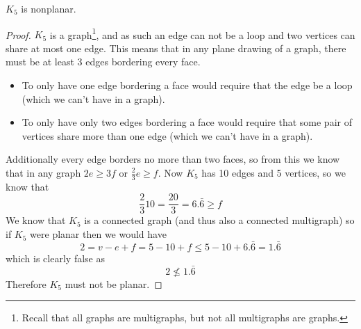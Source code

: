 \documentclass{article}
\begin{document}
\begin{theorem}
	$K_5$ is nonplanar.
\end{theorem}
\begin{center}

	\scalebox{.9}{$K_5$}
\end{center}
\begin{proof}
	$K_5$ is a graph\footnote{Recall that all graphs are multigraphs, but not all multigraphs are graphs.}, and as such an edge can not be a loop and two vertices can share at most one edge. This means that in any plane drawing of a graph, there must be at least 3 edges bordering every face.
	\begin{itemize}
		\item To only have one edge bordering a face would require that the edge be a loop (which we can't have in a graph).
		\item To only have only two edges bordering a face would require that some pair of vertices share more than one edge (which we can't have in a graph).
	\end{itemize}
	Additionally every edge borders no more than two faces, so from this we know that in any graph $2e \ge 3f$ or $\frac23e\ge f$. Now $K_5$ has 10 edges and 5 vertices, so we know that $$\frac2310=\frac{20}3=6.\bar6\ge f$$ We know that $K_5$ is a connected graph (and thus also a connected multigraph) so if $K_5$ were planar then we would have $$2=v-e+f=5-10+f\le5-10+6.\bar6 = 1.\bar6$$ which is clearly false as $$2\not\le1.\bar6$$ Therefore $K_5$ must not be planar.
\end{proof}
\end{document}
